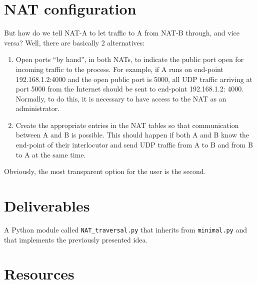 \section{NAT configuration}

But how do we tell NAT-A to let traffic to A from NAT-B through, and
vice versa? Well, there are basically 2 alternatives:

\begin{enumerate}
\item Open ports ``by hand'', in both NATs, to indicate the public
  port open for incoming traffic to the process. For example, if A
  runs on end-point 192.168.1.2:4000 and the open public port is 5000,
  all UDP traffic arriving at port 5000 from the Internet should be
  sent to end-point 192.168.1.2: 4000. Normally, to do this, it is
  necessary to have access to the NAT as an administrator.

\item Create the appropriate entries in the NAT tables so that
  communication between A and B is possible. This should happen if
  both A and B know the end-point of their interlocutor and send UDP
  traffic from A to B and from B to A at the same time.
\end{enumerate}
  
Obviously, the most transparent option for the user is the second.

\section{Deliverables}

A Python module called \texttt{NAT\_traversal.py} that inherits from
\texttt{minimal.py} and that implements the previously presented idea.

\section{Resources}


